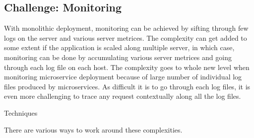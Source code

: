 \subsection{Challenge: Monitoring}\label{section:challanges_of_microservices_architecture/monitoring}
With monolithic deployment, monitoring can be achieved by sifting through few logs on the server and various server metrices. The complexity can get added to some extent if the application is scaled along multiple server, in which case, monitoring can be done by accumulating various server metrices and going through each log file on each host.
The complexity goes to whole new level when monitoring microservice deployment because of large number of individual log files produced by microservices. As difficult it is to go through each log files, it is even more challenging to trace any request contextually along all the log files.
\\
\begin{shaded}Techniques\end{shaded}
There are various ways to work around these complexities. \cite{Newman:2015aa} \cite{Simone:2014aa}
